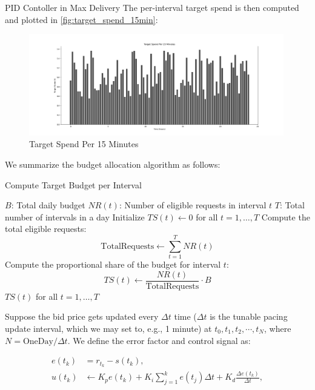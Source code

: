 \documentclass[../main.tex]{subfiles}
\begin{document}
\begin{section}{PID Contoller in Max Delivery}
		The per-interval target spend is then computed and plotted in \autoref{fig:target_spend_15min}:
		
		\begin{figure}[H]
			\centering
			\includegraphics[width=0.99\textwidth]{../Images/target_spend_15min.png}
			\caption{Target Spend Per 15 Minutes}
			\label{fig:target_spend_15min}
		\end{figure}
	
	We summarize the budget allocation algorithm as follows:
	
		\begin{algorithm}[H]
		\caption{Compute Target Budget per Interval}
		\begin{algorithmic}[1]
			\Require $B$: Total daily budget
			\Require $NR(t)$: Number of eligible requests in interval $t$
			\Require $T$: Total number of intervals in a day
			\State Initialize $TS(t) \gets 0$ for all $t = 1, \dots, T$
			\State Compute the total eligible requests:
			\[
			\text{TotalRequests} \gets \sum_{t=1}^{T} NR(t)
			\]
			\State Compute the proportional share of the budget for interval $t$:
			\[
			TS(t) \gets \frac{NR(t)}{\text{TotalRequests}} \cdot B
			\]
			\EndFor
			\State \Return $TS(t)$ for all $t = 1, \dots, T$
		\end{algorithmic}
	\end{algorithm}
	
		Suppose the bid price gets updated every \(\Delta t\) time (\(\Delta t\) is the tunable pacing update interval, which we may set to, e.g., 1 minute) at \(t_0, t_1, t_2, \cdots, t_N\), where \(N = \text{OneDay} / \Delta t\). We define the error factor and control signal as:
		
		\[
		\begin{aligned}
			e(t_k) &= r_{t_k} - s(t_k), \\
			u(t_{k}) &\gets K_p e(t_k) + K_i \sum_{j=1}^{k} e(t_j) \Delta t + K_d \frac{\Delta e(t_k)}{\Delta t},
		\end{aligned}
		\]
		

\end{section}
\end{document}
